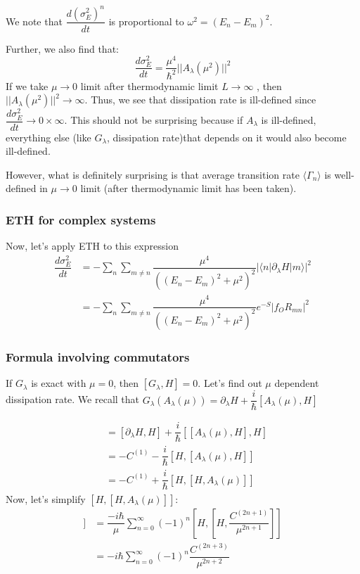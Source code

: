 \documentclass[11pt,a4paper]{article}
\begin{document}
We note that $\dfrac{d (\sigma^2_E)^{n}}{dt}$ is proportional to  $ \omega^2 = (E_n- E_m)^2$.

Further, we also find that:
\begin{equation}
\dfrac{d \sigma^2_E}{dt}= \dfrac{\mu^4}{\hbar^2} || A_{\lambda} (\mu^2)||^2
\end{equation}
If we take $\mu \rightarrow 0$ limit after thermodynamic limit $L \rightarrow \infty$ , then $|| A_{\lambda} (\mu^2)||^2 \rightarrow \infty $. Thus, we see that dissipation rate is ill-defined since $\dfrac{d \sigma^2_E}{dt} \rightarrow 0 \times \infty$. This should not be surprising because if $A_{\lambda}$ is ill-defined, everything else  (like $G_{\lambda}$, dissipation rate)that depends on it would also become ill-defined. 

However, what is definitely surprising is that average transition rate $\langle \Gamma_n \rangle$ is well-defined in $\mu \rightarrow 0$ limit (after thermodynamic limit has been taken).

\subsubsection{ETH for complex systems}



Now, let's apply ETH to this expression 
\begin{align}
\dfrac{d \sigma^2_E}{dt} &=  - \sum_{ n} \sum_{m \neq n}\dfrac{\mu^4}{((E_n-E_m)^2 + \mu^2)^2}  |\langle n |\partial_{\lambda} H |m \rangle|^2 \\
&=  - \sum_{ n} \sum_{m \neq n}\dfrac{\mu^4}{((E_n-E_m)^2 + \mu^2)^2}  e^{-S} |f_{O} R_{mn}|^2
\end{align}





\subsubsection{Formula involving commutators}
If $G_{\lambda}$ is exact with $\mu =0$, then $[G_{\lambda}, H]=0$. Let's find out $\mu$ dependent dissipation rate. We recall that $G_{\lambda}(A_{\lambda} (\mu) )= \partial_{\lambda} H + \dfrac{i}{\hbar} [A_{\lambda} (\mu), H] $

\begin{align}
[G_{\lambda}(A_{\lambda} (\mu)), H] &=[ \partial_{\lambda} H, H]  + \dfrac{i}{\hbar} [[A_{\lambda} (\mu), H],  H] \\
&=- C^{(1)}  - \dfrac{i}{\hbar} [ H, [A_{\lambda} (\mu), H]] \\
&=- C^{(1)} + \dfrac{i}{\hbar} [ H, [H, A_{\lambda} (\mu)]]
\end{align}
Now, let's simplify $[H,[H, A_{\lambda} (\mu)]]$:
\begin{align}
[H,[H, A_{\lambda} (\mu)]] &= \dfrac{-i\hbar}{\mu}  \sum_{n=0}^{\infty}   (-1)^{n} [H, [H,  \dfrac{ C^{(2n+1)}}{\mu^{2n+1}}]]\\
&= -i\hbar  \sum_{n=0}^{\infty}   (-1)^{n}   \dfrac{ C^{(2n+3)}}{\mu^{2n+2}}
\end{align}
\end{document}
